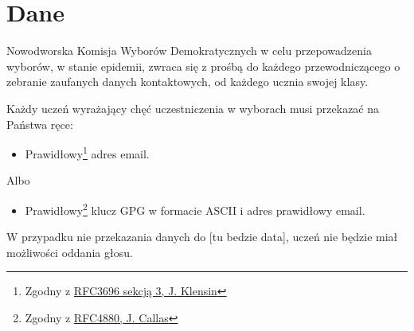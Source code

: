 \section{Dane}


Nowodworska Komisja Wyborów Demokratycznych w celu przepowadzenia wyborów, w stanie epidemii, zwraca się z prośbą do każdego przewodniczącego o zebranie zaufanych danych kontaktowych, od każdego ucznia swojej klasy. \\

\par Każdy uczeń wyrażający chęć uczestniczenia w wyborach musi przekazać na Państwa ręce:

\begin{itemize}
  \item Prawidłowy\footnote{Zgodny z \href{https://tools.ietf.org/html/rfc3696}{RFC3696 sekcją 3, J. Klensin}} adres email.
\end{itemize}

\vspace{-0.3cm}
\hspace{1cm} Albo
\vspace{-0.3cm}

\begin{itemize}
  \item Prawidłowy\footnote{Zgodny z \href{https://tools.ietf.org/html/rfc4880}{RFC4880, J. Callas}} klucz GPG w formacie ASCII i adres prawidłowy email.
\end{itemize}
\vspace{0.3cm} %
W przypadku nie przekazania danych do [tu bedzie data], uczeń nie będzie miał możliwości oddania głosu.
